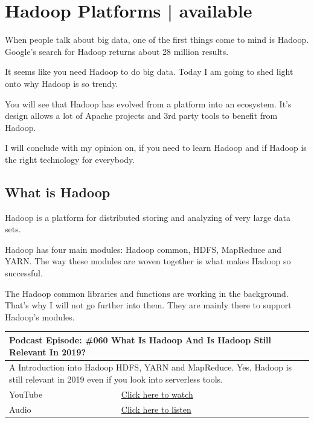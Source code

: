 \documentclass[12pt, numbers=noenddot]{scrreprt} %
\begin{document}
\chapter{Hadoop Platforms | available}
When people talk about big data, one of the first things come to mind is Hadoop. Google’s search for Hadoop returns about 28 million results.

It seems like you need Hadoop to do big data. Today I am going to shed light onto why Hadoop is so trendy.

You will see that Hadoop has evolved from a platform into an ecosystem. It’s design allows a lot of Apache projects and 3rd party tools to benefit from Hadoop.

I will conclude with my opinion on, if you need to learn Hadoop and if Hadoop is the right technology for everybody.

\section{What is Hadoop}

Hadoop is a platform for distributed storing and analyzing of very large data sets.

Hadoop has four main modules: Hadoop common, HDFS, MapReduce and YARN. The way these modules are woven together is what makes Hadoop so successful.

The Hadoop common libraries and functions are working in the background. That’s why I will not go further into them. They are mainly there to support Hadoop’s modules.

\begin{table}[h]
\begin{tabular}{ll}
\hline
\multicolumn{2}{l}{\textbf{Podcast Episode:} \#060 What Is Hadoop And Is Hadoop Still Relevant In 2019?} \\ \hline
\multicolumn{2}{p{15cm}}{A Introduction into Hadoop HDFS, YARN and MapReduce. Yes, Hadoop is still relevant in 2019 even if you look into serverless tools. }         \\ \hline
\multicolumn{1}{l|}{YouTube}   & \href{https://youtu.be/8AWaht3YQgo}{Click here to watch}   \\ 
\multicolumn{1}{l|}{Audio}     & \href{https://anchor.fm/andreaskayy/episodes/060-What-Is-Hadoop-And-Is-Hadoop-Still-Relevant-In-2019-e45ijp}{Click here to listen}   \\ \hline
\end{tabular}
\end{table}
\end{document}
